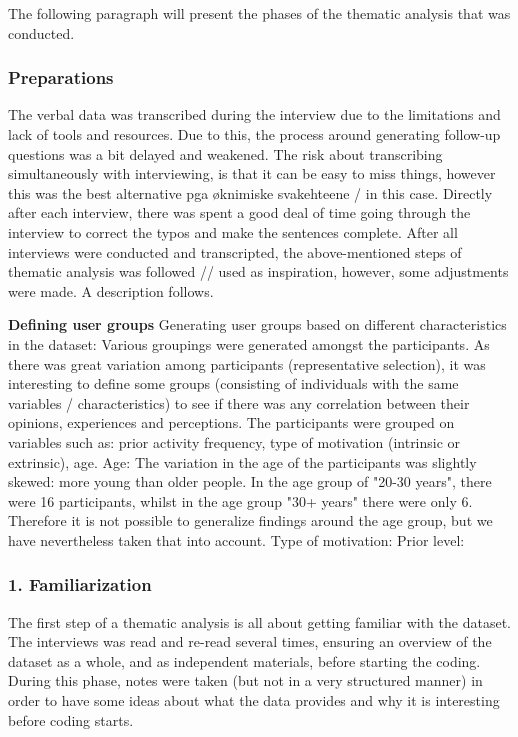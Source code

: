     The following paragraph will present the phases of the thematic analysis that was conducted. 
    
    \subsubsection{Preparations}
    The verbal data was transcribed during the interview due to the limitations and lack of tools and resources. Due to this, the process around generating follow-up questions was a bit delayed and weakened. The risk about transcribing simultaneously with interviewing, is that it can be easy to miss things, however this was the best alternative pga øknimiske svakehteene / in this case. Directly after each interview, there was spent a good deal of time going through the interview to correct the typos and make the sentences complete. After all interviews were conducted and transcripted, the above-mentioned steps of thematic analysis was followed // used as inspiration, however, some adjustments were made. A description follows. 

\textbf{Defining user groups}
    Generating user groups based on different characteristics in the dataset: Various groupings were generated amongst the participants. As there was great variation among participants (representative selection), it was interesting to define some groups (consisting of individuals with the same variables / characteristics) to see if there was any correlation between their opinions, experiences and perceptions. The participants were grouped on variables such as: prior activity frequency, type of motivation (intrinsic or extrinsic), age.
    Age: The variation in the age of the participants was slightly skewed: more young than older people. In the age group of "20-30 years", there were 16 participants, whilst in the age group "30+ years" there were only 6. Therefore it is not possible to generalize findings around the age group, but we have nevertheless taken that into account.
    Type of motivation:
    Prior level: 
    
    \subsubsection{1. Familiarization}
    The first step of a thematic analysis is all about getting familiar with the dataset. The interviews was read and re-read several times, ensuring an overview of the dataset as a whole, and as independent materials, before starting the coding. During this phase, notes were taken (but not in a very structured manner) in order to have some ideas about what the data provides and why it is interesting before coding starts. 
    
